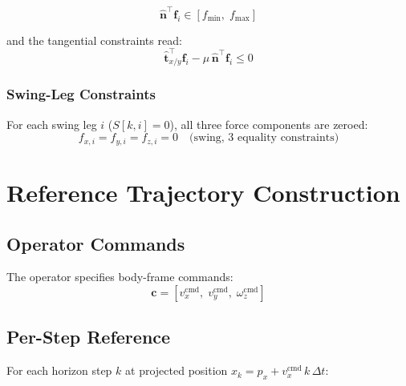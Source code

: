 \documentclass[12pt,a4paper]{report}
\newcommand{\vect}[1]{\bm{#1}}
\begin{document}
\begin{equation}
    \hat{\vect{n}}^\top \vect{f}_i \in [f_\text{min},\; f_\text{max}]
\end{equation}

and the tangential constraints read:
\begin{equation}
    \hat{\vect{t}}_{x/y}^\top \vect{f}_i - \mu\,\hat{\vect{n}}^\top \vect{f}_i \leq 0
\end{equation}

\subsection{Swing-Leg Constraints}

For each swing leg $i$ ($S[k,i] = 0$), all three force components are zeroed:
\begin{equation}
    f_{x,i} = f_{y,i} = f_{z,i} = 0 \quad\text{(swing, 3 equality constraints)}
\end{equation}

\chapter{Reference Trajectory Construction}

\section{Operator Commands}

The operator specifies body-frame commands:
\begin{equation}
    \vect{c} = [v_x^\text{cmd},\; v_y^\text{cmd},\; \omega_z^\text{cmd}]
\end{equation}

\section{Per-Step Reference}

For each horizon step $k$ at projected position $x_k = p_x + v_x^\text{cmd}\,k\,\Delta t$:
\end{document}
